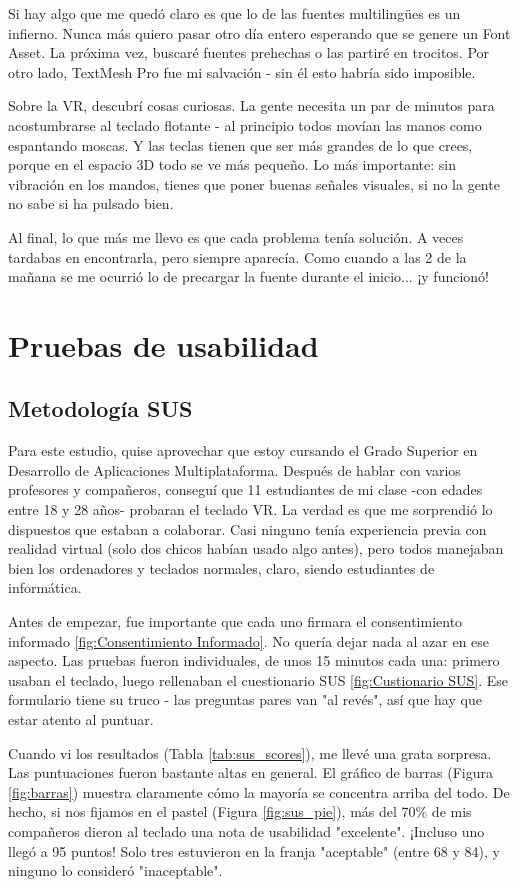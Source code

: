 Si hay algo que me quedó claro es que lo de las fuentes multilingües es un infierno. Nunca más quiero pasar otro día entero esperando que se genere un Font Asset. La próxima vez, buscaré fuentes prehechas o las partiré en trocitos. Por otro lado, TextMesh Pro fue mi salvación - sin él esto habría sido imposible.

Sobre la VR, descubrí cosas curiosas. La gente necesita un par de minutos para acostumbrarse al teclado flotante - al principio todos movían las manos como espantando moscas. Y las teclas tienen que ser más grandes de lo que crees, porque en el espacio 3D todo se ve más pequeño. Lo más importante: sin vibración en los mandos, tienes que poner buenas señales visuales, si no la gente no sabe si ha pulsado bien.

Al final, lo que más me llevo es que cada problema tenía solución. A veces tardabas en encontrarla, pero siempre aparecía. Como cuando a las 2 de la mañana se me ocurrió lo de precargar la fuente durante el inicio... ¡y funcionó!

\section{Pruebas de usabilidad}

\subsection{Metodología SUS}

Para este estudio, quise aprovechar que estoy cursando el Grado Superior en Desarrollo de Aplicaciones Multiplataforma. Después de hablar con varios profesores y compañeros, conseguí que 11 estudiantes de mi clase -con edades entre 18 y 28 años- probaran el teclado VR. La verdad es que me sorprendió lo dispuestos que estaban a colaborar. Casi ninguno tenía experiencia previa con realidad virtual (solo dos chicos habían usado algo antes), pero todos manejaban bien los ordenadores y teclados normales, claro, siendo estudiantes de informática.

Antes de empezar, fue importante que cada uno firmara el consentimiento informado \ref{fig:Consentimiento Informado}. No quería dejar nada al azar en ese aspecto. Las pruebas fueron individuales, de unos 15 minutos cada una: primero usaban el teclado, luego rellenaban el cuestionario SUS \ref{fig:Custionario SUS}. Ese formulario tiene su truco - las preguntas pares van "al revés", así que hay que estar atento al puntuar.

Cuando vi los resultados (Tabla \ref{tab:sus_scores}), me llevé una grata sorpresa. Las puntuaciones fueron bastante altas en general. El gráfico de barras (Figura \ref{fig:barras}) muestra claramente cómo la mayoría se concentra arriba del todo. De hecho, si nos fijamos en el pastel (Figura \ref{fig:sus_pie}), más del 70\% de mis compañeros dieron al teclado una nota de usabilidad "excelente". ¡Incluso uno llegó a 95 puntos! Solo tres estuvieron en la franja "aceptable" (entre 68 y 84), y ninguno lo consideró "inaceptable".

